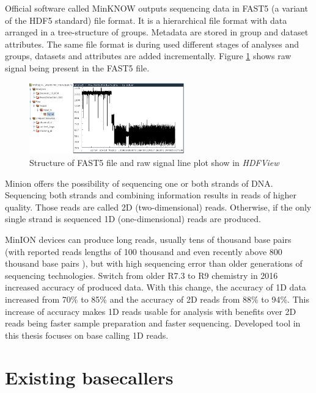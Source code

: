 \documentclass[times, utf8, diplomski, numeric, english]{fer}
\begin{document}
Official software called MinKNOW outputs sequencing data in FAST5 (a variant of the HDF5 standard) file format. It is a hierarchical file format with data arranged in a tree-structure of groups. Metadata are stored in group and dataset attributes. The same file format is during used different stages of analyses and groups, datasets and attributes are added incrementally. Figure \ref{fg:fast5} shows raw signal being present in the FAST5 file.
\begin{figure}[!ht]
	\begin{center}
		\includegraphics[width=0.6\textwidth]{./imgs/fast5.png}
		\caption[Structure of FAST5 file and raw signal plot show in \textit{HDFView}]{Structure of FAST5 file and raw signal line plot show in \textit{HDFView} \protect\footnotemark}
		\label{fg:fast5}
	\end{center}
\end{figure}

Minion offers the possibility of sequencing one or both strands of DNA. Sequencing both strands and combining information results in reads of higher quality. Those reads are called 2D (two-dimensional) reads. Otherwise, if the only single strand is sequenced 1D (one-dimensional) reads are produced.

MinION devices can produce long reads, usually tens of thousand base pairs (with reported reads lengths of 100 thousand \cite{loman1-100k} and even recently above 800 thousand base pairs \cite{loman2-800k}), but with high sequencing error than older generations of sequencing technologies.
Switch from older R7.3 to  R9 chemistry in 2016 increased accuracy of produced data. With this change, the accuracy of 1D data increased from 70\% to 85\% and the accuracy of 2D reads from 88\% to 94\%\cite{nanopore_video}.  This increase of accuracy makes 1D reads usable for analysis with benefits over 2D reads being faster sample preparation and faster sequencing. Developed tool in this thesis focuses on base calling 1D reads.


  
\section{Existing basecallers}
\end{document}

